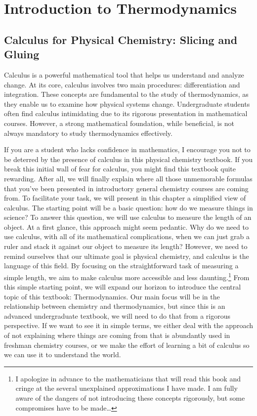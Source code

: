\documentclass[
  9pt,
]{extbook}
\let\origdoublepage\cleardoublepage
\newcommand{\clearemptydoublepage}{%
  \clearpage
  {\pagestyle{empty}\origdoublepage}%
}
\let\cleardoublepage\clearemptydoublepage
\theoremstyle{definition}
\theoremstyle{definition}
\theoremstyle{definition}
\theoremstyle{definition}
\theoremstyle{remark}
\begin{document}
\cleardoublepage
{}

\chapter{Introduction to Thermodynamics}\label{SystemVariables}

\section{Calculus for Physical Chemistry: Slicing and Gluing}\label{calculus-for-physical-chemistry-slicing-and-gluing}

Calculus is a powerful mathematical tool that helps us understand and analyze change. At its core, calculus involves two main procedures: differentiation and integration. These concepts are fundamental to the study of thermodynamics, as they enable us to examine how physical systems change. Undergraduate students often find calculus intimidating due to its rigorous presentation in mathematical courses. However, a strong mathematical foundation, while beneficial, is not always mandatory to study thermodynamics effectively.

If you are a student who lacks confidence in mathematics, I encourage you not to be deterred by the presence of calculus in this physical chemistry textbook. If you break this initial wall of fear for calculus, you might find this textbook quite rewarding. After all, we will finally explain where all those unmemorable formulas that you've been presented in introductory general chemistry courses are coming from. To facilitate your task, we will present in this chapter a simplified view of calculus. The starting point will be a basic question: how do we measure things in science? To answer this question, we will use calculus to measure the length of an object. At a first glance, this approach might seem pedantic. Why do we need to use calculus, with all of its mathematical complications, when we can just grab a ruler and stack it against our object to measure its length? However, we need to remind ourselves that our ultimate goal is physical chemistry, and calculus is the language of this field. By focusing on the straightforward task of measuring a simple length, we aim to make calculus more accessible and less daunting.\footnote{I apologize in advance to the mathematicians that will read this book and cringe at the several unexplained approximations I have made. I am fully aware of the dangers of not introducing these concepts rigorously, but some compromises have to be made\ldots{}} From this simple starting point, we will expand our horizon to introduce the central topic of this textbook: Thermodynamics. Our main focus will be in the relationship between chemistry and thermodynamics, but since this is an advanced undergraduate textbook, we will need to do that from a rigorous perspective. If we want to see it in simple terms, we either deal with the approach of not explaining where things are coming from that is abundantly used in freshman chemistry courses, or we make the effort of learning a bit of calculus so we can use it to understand the world.
\end{document}
